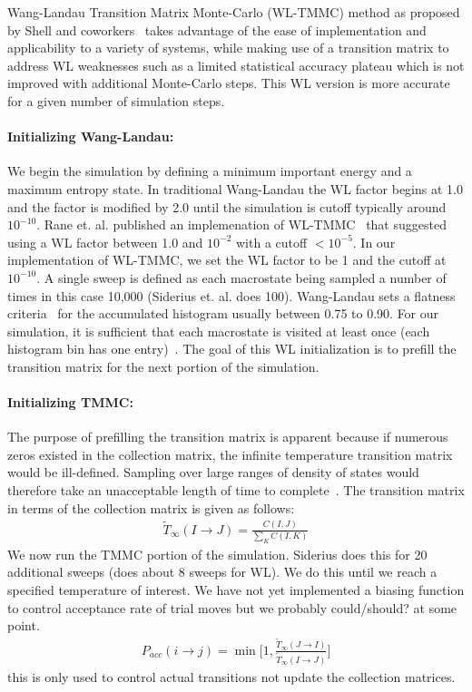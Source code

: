 \documentclass[letterpaper,twocolumn,amsmath,amssymb,pre,aps,10pt]{revtex4-1}
\begin{document}
Wang-Landau Transition Matrix Monte-Carlo (WL-TMMC) method as proposed
by Shell and coworkers~\cite{shell2003improved,shell2004flat} takes
advantage of the ease of implementation and applicability to a variety
of systems, while making use of a transition matrix to address WL
weaknesses such as a limited statistical accuracy plateau which is not
improved with additional Monte-Carlo steps.  This WL version is more
accurate for a given number of simulation steps.

\paragraph{Initializing Wang-Landau:} We begin the simulation by
defining a minimum important energy and a maximum entropy state. In
traditional Wang-Landau the WL factor begins at 1.0 and the factor is
modified by 2.0 until the simulation is cutoff typically around
$10^{-10}$.  Rane et. al. published an implemenation of
WL-TMMC~\cite{rane2013monte} that suggested using a WL factor between 1.0 and
$10^{-2}$ with a cutoff $<10^{-5}$. In our implementation of WL-TMMC,
we set the WL factor to be 1 and the cutoff at $10^{-10}$. A single
sweep is defined as each macrostate being sampled a number of times in
this case 10,000 (Siderius et. al. does 100). Wang-Landau sets a
flatness criteria~\cite{wang2001determining, wang2001efficient,
hatch2015computational, mahynski2017predicting} for the accumulated
histogram usually between 0.75 to 0.90.  For our simulation, it is
sufficient that each macrostate is visited at least once (each
histogram bin has one entry)~\cite{shell2003improved}.  The goal of
this WL initialization is to prefill the transition matrix for the next
portion of the simulation.
\paragraph{Initializing TMMC:} The purpose of prefilling the transition
matrix is apparent because if numerous zeros existed in the collection
matrix, the infinite temperature transition matrix would be
ill-defined.  Sampling over large ranges of density of states would
therefore take an unacceptable length of time to
complete~\cite{shell2003improved, shen2014elucidating}.  The transition
matrix in terms of the collection matrix is given as follows:
\begin{align}
\widetilde{T}_{\infty}(I\rightarrow J) = \frac{C(I,J)}
{\sum_{K} C(I,K)}
\end{align}
We now run the TMMC portion of the simulation.  Siderius does this for
20 additional sweeps (does about 8 sweeps for WL).  We do this until we
reach a specified temperature of interest.
We have not yet implemented a biasing function to control acceptance
rate of trial moves but we probably could/should? at some point.
\begin{align}
  P_{acc}(i\rightarrow j) = \min\bigg[1,\frac{\widetilde{T}_{\infty}(J\rightarrow I)}
  {\widetilde{T}_{\infty}(I\rightarrow J)}\bigg]
\end{align}
this is only used to control actual transitions not update the collection
matrices.
\end{document}
